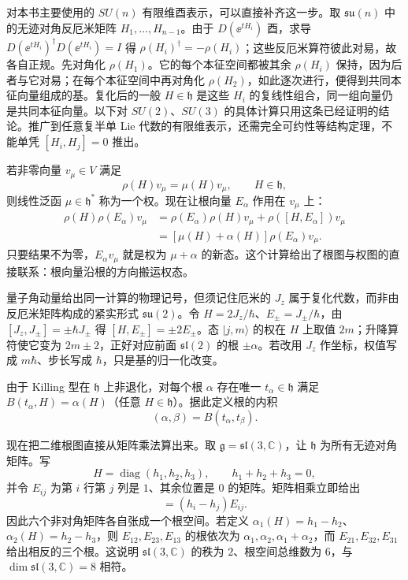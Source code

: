 对本书主要使用的 $SU(n)$ 有限维酉表示，可以直接补齐这一步。取 $\mathfrak{su}(n)$ 中的无迹对角反厄米矩阵 $H_1,\ldots,H_{n-1}$。由于 $D(\ee^{tH_i})$ 酉，求导 $D(\ee^{tH_i})^\dagger D(\ee^{tH_i})=I$ 得 $\rho(H_i)^\dagger=-\rho(H_i)$；这些反厄米算符彼此对易，故各自正规。先对角化 $\rho(H_1)$。它的每个本征空间都被其余 $\rho(H_i)$ 保持，因为后者与它对易；在每个本征空间中再对角化 $\rho(H_2)$，如此逐次进行，便得到共同本征向量组成的基。复化后的一般 $H\in\mathfrak h$ 是这些 $H_i$ 的复线性组合，同一组向量仍是共同本征向量。以下对 $SU(2)$、$SU(3)$ 的具体计算只用这条已经证明的结论。推广到任意复半单 Lie 代数的有限维表示，还需完全可约性等结构定理，不能单凭 $[H_i,H_j]=0$ 推出。

若非零向量 $v_\mu\in V$ 满足
\begin{equation}
\rho(H)v_\mu=\mu(H)v_\mu,
\qquad H\in\mathfrak h,
\label{eq:weight-definition}
\end{equation}
则线性泛函 $\mu\in\mathfrak h^*$ 称为一个权。现在让根向量 $E_\alpha$ 作用在 $v_\mu$ 上：
\begin{align*}
\rho(H)\rho(E_\alpha)v_\mu
&=\rho(E_\alpha)\rho(H)v_\mu
 +\rho([H,E_\alpha])v_\mu\\
&=[\mu(H)+\alpha(H)]\rho(E_\alpha)v_\mu.
\end{align*}
只要结果不为零，$E_\alpha v_\mu$ 就是权为 $\mu+\alpha$ 的新态。这个计算给出了根图与权图的直接联系：根向量沿根的方向搬运权态。

量子角动量给出同一计算的物理记号，但须记住厄米的 $J_z$ 属于复化代数，而非由反厄米矩阵构成的紧实形式 $\mathfrak{su}(2)$。令 $H=2J_z/\hbar$、$E_\pm=J_\pm/\hbar$，由 $[J_z,J_\pm]=\pm\hbar J_\pm$ 得 $[H,E_\pm]=\pm2E_\pm$。态 $|j,m\rangle$ 的权在 $H$ 上取值 $2m$；升降算符使它变为 $2m\pm2$，正好对应前面 $\mathfrak{sl}(2)$ 的根 $\pm\alpha$。若改用 $J_z$ 作坐标，权值写成 $m\hbar$、步长写成 $\hbar$，只是基的归一化改变。

由于 Killing 型在 $\mathfrak h$ 上非退化，对每个根 $\alpha$ 存在唯一 $t_\alpha\in\mathfrak h$ 满足 $B(t_\alpha,H)=\alpha(H)$（任意 $H\in\mathfrak h$）。据此定义根的内积
\begin{equation}
(\alpha,\beta)=B(t_\alpha,t_\beta).
\label{eq:root-inner-product}
\end{equation}

现在把二维根图直接从矩阵乘法算出来。取 \(\mathfrak g=\mathfrak{sl}(3,\mathbb C)\)，让 \(\mathfrak h\) 为所有无迹对角矩阵。写
\[
H=\operatorname{diag}(h_1,h_2,h_3),\qquad h_1+h_2+h_3=0,
\]
并令 \(E_{ij}\) 为第 \(i\) 行第 \(j\) 列是 \(1\)、其余位置是 \(0\) 的矩阵。矩阵相乘立即给出
\begin{equation}
[H,E_{ij}]=(h_i-h_j)E_{ij}.
\label{eq:sl3-matrix-unit-root}
\end{equation}
因此六个非对角矩阵各自张成一个根空间。若定义 \(\alpha_1(H)=h_1-h_2\)、\(\alpha_2(H)=h_2-h_3\)，则 \(E_{12},E_{23},E_{13}\) 的根依次为 \(\alpha_1,\alpha_2,\alpha_1+\alpha_2\)，而 \(E_{21},E_{32},E_{31}\) 给出相反的三个根。这说明 \(\mathfrak{sl}(3,\mathbb C)\) 的秩为 \(2\)、根空间总维数为 \(6\)，与 \(\dim\mathfrak{sl}(3,\mathbb C)=8\) 相符。

